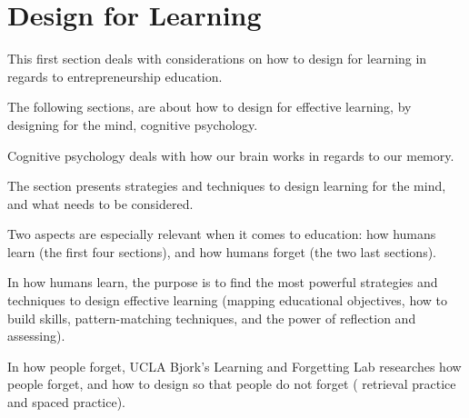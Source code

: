 \section{Design for Learning}


This first section deals with considerations on how to design for learning in regards to entrepreneurship education.

The following sections, are about how to design for effective learning, by designing for the mind, cognitive psychology.

Cognitive psychology deals with how our brain works in regards to our memory.

The section presents strategies and techniques to design learning for the mind, and what needs to be considered.

Two aspects are especially relevant when it comes to education: how humans learn (the first four sections), and how humans forget (the two last sections).

In how humans learn, the purpose is to find the most powerful strategies and techniques to design effective learning (mapping educational objectives, how to build skills, pattern-matching techniques, and the power of reflection and assessing).

In how people forget, UCLA Bjork's Learning and Forgetting Lab \cite{ucla} researches how people forget, and how to design so that people do not forget ( retrieval practice and spaced practice).






